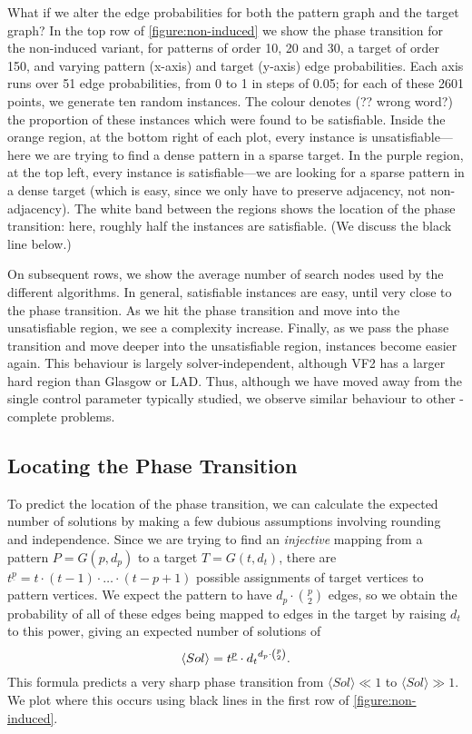 \documentclass[letterpaper]{article}
\begin{document}
What if we alter the edge probabilities for both the pattern graph and the target graph?  In the top
row of \cref{figure:non-induced} we show the phase transition for the non-induced variant, for
patterns of order 10, 20 and 30, a target of order 150, and varying pattern (x-axis) and target
(y-axis) edge probabilities. Each axis runs over 51 edge probabilities, from 0 to 1 in steps of
0.05; for each of these 2601 points, we generate ten random instances. The colour denotes (?? wrong
word?) the proportion of these instances which were found to be satisfiable.  Inside the orange
region, at the bottom right of each plot, every instance is unsatisfiable---here we are trying to
find a dense pattern in a sparse target. In the purple region, at the top left, every instance is
satisfiable---we are looking for a sparse pattern in a dense target (which is easy, since we only
have to preserve adjacency, not non-adjacency). The white band between the regions shows the
location of the phase transition: here, roughly half the instances are satisfiable. (We discuss the
black line below.)

On subsequent rows, we show the average number of search nodes used by the different algorithms. In
general, satisfiable instances are easy, until very close to the phase transition. As we hit the
phase transition and move into the unsatisfiable region, we see a complexity increase. Finally, as
we pass the phase transition and move deeper into the unsatisfiable region, instances become easier
again. This behaviour is largely solver-independent, although VF2 has a larger hard region than
Glasgow or LAD. Thus, although we have moved away from the single control parameter typically
studied, we observe similar behaviour to other \NP-complete problems.

\subsection{Locating the Phase Transition}

To predict the location of the phase transition, we can calculate the expected number of solutions
by making a few dubious assumptions involving rounding and independence. Since we are trying to find
an \emph{injective} mapping from a pattern $P = G(p, d_p)$ to a target $T = G(t, d_t)$, there are
$t^{\underline{p}} = t \cdot (t - 1) \cdot \ldots \cdot (t - p + 1)$ possible assignments of target
vertices to pattern vertices.  We expect the pattern to have $d_p \cdot \binom{p}{2}$ edges, so we
obtain the probability of all of these edges being mapped to edges in the target by raising $d_t$ to
this power, giving an expected number of solutions of \[ \langle Sol \rangle = t^{\underline{p}}
\cdot {d_t}^{d_p \cdot \binom{p}{2}} \textnormal{.} \] This formula predicts a very sharp phase
transition from $\langle Sol \rangle \ll 1$ to $\langle Sol \rangle \gg 1$. We plot where this
occurs using black lines in the first row of \cref{figure:non-induced}.
\end{document}
